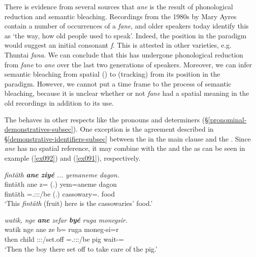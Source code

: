 There is evidence from several sources that \emph{ane} is the result of phonological reduction and semantic bleaching. Recordings from the 1980s by Mary Ayres contain a number of occurrences of a  \emph{fane}, and older speakers today identify this as `the way, how old people used to speak'. Indeed, the position in the paradigm would suggest an initial consonant \emph{f}. This is attested in other  varieties, e.g.  Thuntai \emph{fana}. We can conclude that this  has undergone phonological reduction from \emph{fane} to \emph{ane} over the last two generations of speakers. Moreover, we can infer semantic bleaching from spatial () to  (tracking) from its position in the paradigm. However, we cannot put a time frame to the process of semantic bleaching, because it is unclear whether or not \emph{fane} had a spatial meaning in the old recordings in addition to its  use.

  
The   behaves in other respects like the  pronouns and determiners ({\S}\ref{pronominal-demonstratives-subsec}). One exception is the agreement described in {\S}\ref{demonstrative-identifiers-subsec} between the  in the main clause and the  . Since \emph{ane} has no spatial reference, it may combine with the  and the    as can be seen in example (\ref{ex092}) and (\ref{ex091}), respectively.

\begin{exe}
	\ex \emph{fintäth \textbf{ane} \textbf{ziyé} ... yemaneme dagon.}\\
	\gll fintäth ane z= (.) yem=aneme dagon\\
	fintäth {\Dem} \Prox=\Tsg.\Masc:\Sbj:\Nonpast:\Ipfv/be (.) cassowary={\Poss}.{\Nsg} food\\
	\trans `This \emph{fintäth} (fruit) here is the cassowaries' food.'
	\label{ex092}
\end{exe}
\begin{exe}
	\ex \emph{watik, nge \textbf{ane} zefar \textbf{byé} ruga monegsir.}\\
	\gll watik nge ane ze b= ruga moneg-si=r\\
	then child {\Dem} \Stsg:\Sbj:\Rpst:\Pfv/set.off \Med{}=\Tsg.\Masc:\Sbj:\Nonpast:\Ipfv/be pig wait-{\Nmlz}={\Purp}\\
	\trans `Then the boy there set off to take care of the pig.' 
	\label{ex091}
\end{exe}

